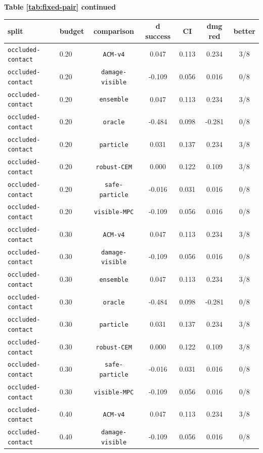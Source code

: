 \documentclass{article}
\begin{document}
\begin{center}
\textbf{Table \ref{tab:fixed-pair} continued}\\[0.4ex]
\begin{tabular}{llccccc}
\toprule
split & budget & comparison & d success & CI & dmg red & better \\
\midrule
\texttt{occluded-contact} & 0.20 & \texttt{ACM-v4} & 0.047 & 0.113 & 0.234 & 3/8 \\
\texttt{occluded-contact} & 0.20 & \texttt{damage-visible} & -0.109 & 0.056 & 0.016 & 0/8 \\
\texttt{occluded-contact} & 0.20 & \texttt{ensemble} & 0.047 & 0.113 & 0.234 & 3/8 \\
\texttt{occluded-contact} & 0.20 & \texttt{oracle} & -0.484 & 0.098 & -0.281 & 0/8 \\
\texttt{occluded-contact} & 0.20 & \texttt{particle} & 0.031 & 0.137 & 0.234 & 3/8 \\
\texttt{occluded-contact} & 0.20 & \texttt{robust-CEM} & 0.000 & 0.122 & 0.109 & 3/8 \\
\texttt{occluded-contact} & 0.20 & \texttt{safe-particle} & -0.016 & 0.031 & 0.016 & 0/8 \\
\texttt{occluded-contact} & 0.20 & \texttt{visible-MPC} & -0.109 & 0.056 & 0.016 & 0/8 \\
\texttt{occluded-contact} & 0.30 & \texttt{ACM-v4} & 0.047 & 0.113 & 0.234 & 3/8 \\
\texttt{occluded-contact} & 0.30 & \texttt{damage-visible} & -0.109 & 0.056 & 0.016 & 0/8 \\
\texttt{occluded-contact} & 0.30 & \texttt{ensemble} & 0.047 & 0.113 & 0.234 & 3/8 \\
\texttt{occluded-contact} & 0.30 & \texttt{oracle} & -0.484 & 0.098 & -0.281 & 0/8 \\
\texttt{occluded-contact} & 0.30 & \texttt{particle} & 0.031 & 0.137 & 0.234 & 3/8 \\
\texttt{occluded-contact} & 0.30 & \texttt{robust-CEM} & 0.000 & 0.122 & 0.109 & 3/8 \\
\texttt{occluded-contact} & 0.30 & \texttt{safe-particle} & -0.016 & 0.031 & 0.016 & 0/8 \\
\texttt{occluded-contact} & 0.30 & \texttt{visible-MPC} & -0.109 & 0.056 & 0.016 & 0/8 \\
\texttt{occluded-contact} & 0.40 & \texttt{ACM-v4} & 0.047 & 0.113 & 0.234 & 3/8 \\
\texttt{occluded-contact} & 0.40 & \texttt{damage-visible} & -0.109 & 0.056 & 0.016 & 0/8 \\

\end{tabular}
\end{center}
\end{document}
